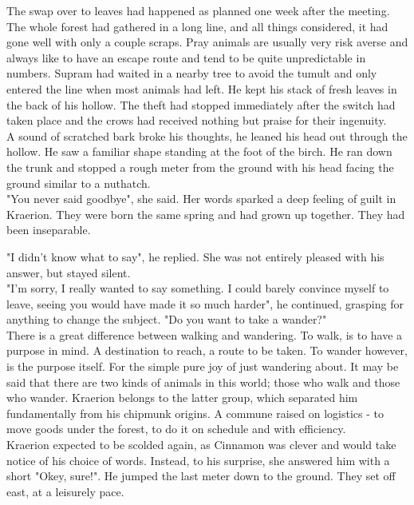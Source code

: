 \documentclass[smalldemyvopaper,11pt,twoside,onecolumn,openright,extrafontsizes]{memoir}
\begin{document}
The swap over to leaves had happened as planned one week after the meeting. The whole forest had gathered in a long line, and all things considered, it had gone well with only a couple scraps. Pray animals are usually very risk averse and always like to have an escape route and tend to be quite unpredictable in numbers. Supram had waited in a nearby tree to avoid the tumult and only entered the line when most animals had left. He kept his stack of fresh leaves in the back of his hollow. The theft had stopped immediately after the switch had taken place and the crows had received nothing but praise for their ingenuity.\\

A sound of scratched bark broke his thoughts, he leaned his head out through the hollow. He saw a familiar shape standing at the foot of the birch. He ran down the trunk and stopped a rough meter from the ground with his head facing the ground similar to a nuthatch.\\

"You never said goodbye", she said. Her words sparked a deep feeling of guilt in Kraerion. They were born the same spring and had grown up together. They had been inseparable. 

"I didn't know what to say", he replied. She was not entirely pleased with his answer, but stayed silent.\\

"I'm sorry, I really wanted to say something. I could barely convince myself to leave, seeing you would have made it so much harder", he continued, grasping for anything to change the subject. "Do you want to take a wander?" \\ 


There is a great difference between walking and wandering. To walk, is to have a purpose in mind. A destination to reach, a route to be taken. To wander however, is the purpose itself. For the simple pure joy of just wandering about. It may be said that there are two kinds of animals in this world; those who walk and those who wander. Kraerion belongs to the latter group, which separated him fundamentally from his chipmunk origins. A commune raised on logistics - to move goods under the forest, to do it on schedule and with efficiency. \\

Kraerion expected to be scolded again, as Cinnamon was clever and would take notice of his choice of words. Instead, to his surprise, she answered him with a short "Okey, sure!". He jumped the last meter down to the ground. They set off east, at a leisurely pace. \\
\end{document}
